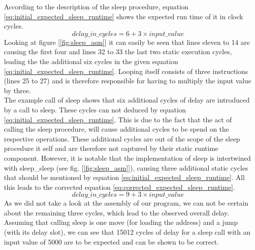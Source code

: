 			According to the description of the sleep procedure, equation \ref{eq:initial_expected_sleep_runtime} shows the expected run time of it in clock cycles. 
			\begin{equation} 
				\label{eq:initial_expected_sleep_runtime}
				delay\_in\_cycles = 6 + 3 \times input\_value
			\end{equation} 
			Looking at figure [\ref{fig:sleep_asm}] it can easily be seen that lines eleven to 14 are causing the first four and lines 32 to 33 the last two static execution cycles, leading the the additional six cycles in the given equation \ref{eq:initial_expected_sleep_runtime}. Looping itself consists of three instructions (lines 25 to 27) and is therefore responsible for having to multiply the input value by three.\\
			The example call of sleep shows that six additional cycles of delay are introduced by a call to sleep. These cycles can not deduced by equation \ref{eq:initial_expected_sleep_runtime}. This is due to the fact that the act of calling the sleep procedure, will cause additional cycles to be spend on the respective operations. These additional cycles are out of the scope of the sleep procedure it self and are therefore not captured by their static runtime component. However, it is notable that the implementation of sleep is intertwined with sleep\_sleep (see fig. [\ref{fig:sleep_asm}]), causing three additional static cycles that should be mentioned by equation \ref{eq:initial_expected_sleep_runtime}. All this leads to the corrected equation \ref{eq:corrected_expected_sleep_runtime}.
			\begin{equation} 
				\label{eq:corrected_expected_sleep_runtime}
				delay\_in\_cycles = 9 + 3 \times input\_value
			\end{equation} 
			As we did not take a look at the assembly of our program, we can not be certain about the remaining three cycles, which lead to the observed overall delay. Assuming that calling sleep is one move (for loading the address) and a jump (with its delay slot), we can see that 15012 cycles of delay for a sleep call with an input value of 5000 are to be expected and can be shown to be correct.

